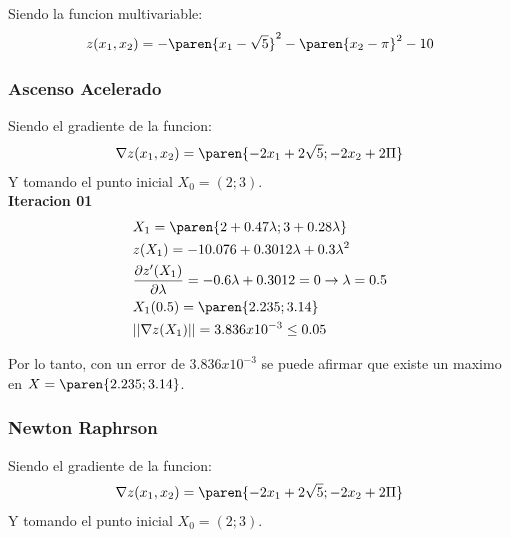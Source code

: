 \begin{homeworkProblem}
Siendo la funcion multivariable:
\begin{align*}
    z(x_1,x_2)=-\paren{x_1-\sqrt{5}}^2 -\paren{x_2-\pi}^2 - 10
\end{align*}

\subsubsection{Ascenso Acelerado}   

Siendo el gradiente de la funcion:
\begin{align*}
    \nabla z(x_1,x_2)=\paren{-2x_1+2\sqrt{5};-2x_2+2\Pi}
\end{align*}
Y tomando el punto inicial $X_0=(2;3)$.\\

\textbf{Iteracion 01}\\
\begin{align*}
    &X_1=\paren{2+0.47\lambda ; 3+0.28\lambda}\\
    &z(X_1)=-10.076 + 0.3012\lambda + 0.3\lambda^2\\
    &\frac{\partial z'(X_1) }{\partial \lambda}=-0.6\lambda + 0.3012 = 0 \rightarrow \lambda = 0.5\\
    &X_1(0.5)=\paren{ 2.235 ; 3.14 }\\
    &||\nabla z(X_1)|| = 3.836x10^{-3} \leq 0.05
\end{align*}

Por lo tanto, con un error de $3.836x10^{-3}$ se puede afirmar que existe un maximo en $X=\paren{2.235;3.14}$.


\subsubsection{Newton Raphrson}   

Siendo el gradiente de la funcion:
\begin{align*}
    \nabla z(x_1,x_2)=\paren{-2x_1+2\sqrt{5};-2x_2+2\Pi}
\end{align*}
Y tomando el punto inicial $X_0=(2;3)$.\\


\end{homeworkProblem}
